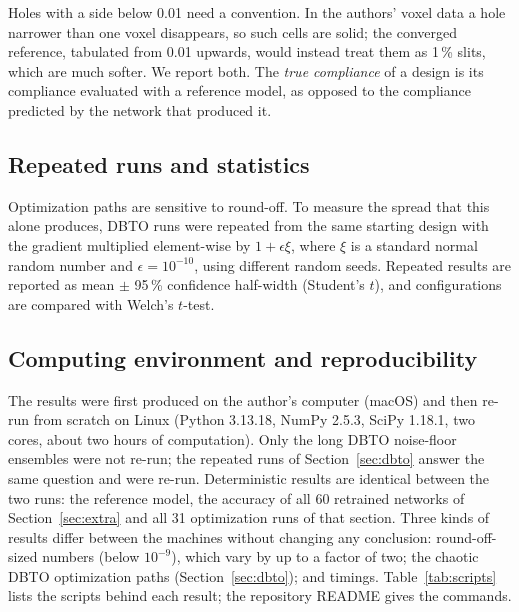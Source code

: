 Holes with a side below 0.01 need a convention. In the authors' voxel data a
hole narrower than one voxel disappears, so such cells are solid; the
converged reference, tabulated from 0.01 upwards, would instead treat them as
1\,\% slits, which are much softer. We report both. The \emph{true compliance}
of a design is its compliance evaluated with a reference model, as opposed to
the compliance predicted by the network that produced it.

\subsection{Repeated runs and statistics}\label{sec:noise}
Optimization paths are sensitive to round-off. To measure the spread that this
alone produces, DBTO runs were repeated from the same starting design with the
gradient multiplied element-wise by $1+\epsilon\xi$, where $\xi$ is a standard
normal random number and $\epsilon=10^{-10}$, using different random seeds.
Repeated results are reported as mean $\pm$ 95\,\% confidence half-width
(Student's $t$), and configurations are compared with Welch's $t$-test.

\subsection{Computing environment and reproducibility}
The results were first produced on the author's computer (macOS) and then
re-run from scratch on Linux (Python 3.13.18, NumPy 2.5.3, SciPy 1.18.1, two
cores, about two hours of computation). Only the long DBTO noise-floor
ensembles were not re-run; the repeated runs of Section~\ref{sec:dbto} answer
the same question and were re-run. Deterministic results are identical
between the two runs: the reference model, the accuracy of all 60 retrained
networks of Section~\ref{sec:extra} and all 31 optimization runs of that
section. Three kinds of results differ between the machines without changing
any conclusion: round-off-sized numbers (below $10^{-9}$), which vary by up to a
factor of two; the chaotic DBTO optimization paths
(Section~\ref{sec:dbto}); and timings. Table~\ref{tab:scripts} lists the
scripts behind each result; the repository README gives the commands.

